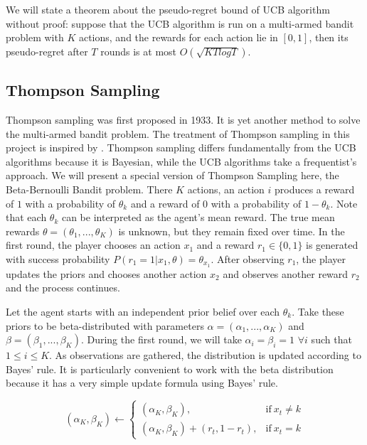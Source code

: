 \documentclass[12pt]{article}
\begin{document}
We will state a theorem about the pseudo-regret bound of UCB algorithm without proof: suppose that the UCB algorithm is run on a multi-armed bandit problem with $K$ actions, and the rewards for each action lie in $[0,1]$, then its pseudo-regret after $T$ rounds is at most $O(\sqrt{KTlogT})$.

\subsection{Thompson Sampling}

Thompson sampling was first proposed in 1933\cite{thompson}. It is yet another method to solve the multi-armed bandit problem. The treatment of Thompson sampling in this project is inspired by \cite{ThomsonTutorial}. Thompson sampling differs fundamentally from the UCB algorithms because it is Bayesian, while the UCB algorithms take a frequentist's approach. We will present a special version of Thompson Sampling here, the Beta-Bernoulli Bandit problem. There $K$ actions, an action $i$ produces a reward of $1$ with a probability of $\theta_k$ and a reward of $0$ with a probability of $1-\theta_k$. Note that each $\theta_k$ can be interpreted as the agent's mean reward. The true mean rewards $\theta = (\theta_1, ..., \theta_K)$ is unknown, but they remain fixed over time. In the first round, the player chooses an action $x_1$ and a reward $r_1 \in \{0,1\}$ is generated with success probability $P(r_1 = 1 |x_1, \theta) = \theta_{x_1}$. After observing $r_1$, the player updates the priors and chooses another action $x_2$ and observes another reward $r_2$ and the process continues. 

Let the agent starts with an independent prior belief over each $\theta_k$. Take these priors to be beta-distributed  with parameters $\alpha = (\alpha_1, ..., \alpha_K)$ and $\beta = (\beta_1, ..., \beta_K)$. During the first round, we will take $\alpha_i = \beta_i = 1$ $\forall i$ such that $1 \leq i \leq K$. As observations are gathered, the distribution is updated according to Bayes' rule. It is particularly convenient to work with the beta distribution because it has a very simple update formula using Bayes' rule. 

\begin{equation}
 	(\alpha_K, \beta_K) \leftarrow
    \begin{cases}
      (\alpha_K, \beta_K), & \text{if}\ x_t \neq k \\
      (\alpha_K, \beta_K) + (r_t,1-r_t), & \text{if}\ x_t = k
    \end{cases}
 \end{equation}
 
\end{document}
